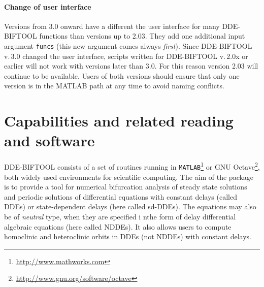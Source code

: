 \documentclass[10pt]{scrartcl}
\newcommand{\DDEBIFCODE}{\textsc{DDE-BIFTOOL}}
\newcommand{\blist}[1]{\mbox{\lstinline!#1!}}
\begin{document}
\paragraph{Change of user interface}
Versions from 3.0 onward have a different the user interface for many
\DDEBIFCODE{} functions than versions up to 2.03. They add one
additional input argument \blist{funcs} (this new argument comes
always \emph{first}).  Since \DDEBIFCODE{} v.\,3.0 changed the user
interface, scripts written for \DDEBIFCODE{} v.\,2.0x or earlier will
not work with versions later than 3.0. For this reason version 2.03
will continue to be available. Users of both versions should ensure
that only one version is in the MATLAB path at any time to avoid
naming conflicts.

\section{Capabilities and related reading and
  software}
\label{sec:intro} {\DDEBIFCODE} consists of a set of routines running
in \texttt{MATLAB}\footnote{\url{http://www.mathworks.com}}
\cite{Mat00} or GNU
Octave\footnote{\url{http://www.gnu.org/software/octave}}, both widely
used environments for scientific computing.  The aim of the package is
to provide a tool for numerical bifurcation analysis of steady state
solutions and periodic solutions of differential equations with
constant delays (called DDEs) or state-dependent delays (here called
sd-DDEs). The equations may also be of \emph{neutral} type, when they
are specified i nthe form of delay differential algebraic equations
(here called NDDEs). It also allows users to compute homoclinic and
heteroclinic orbits in DDEs (not NDDEs) with constant delays.
\end{document}
